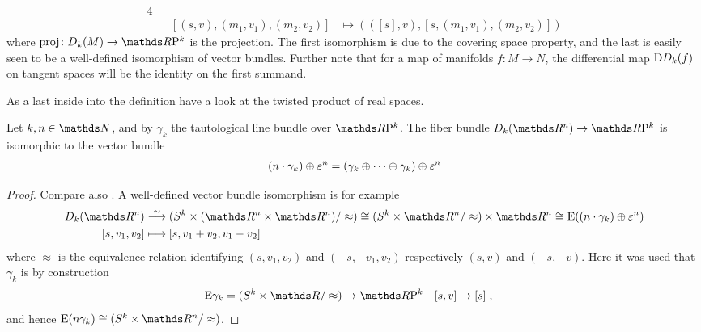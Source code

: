 \begin{Rem}
\begin{enumerate}
\begin{enumerate}
\begin{alignat*}{4}
        \\
        &&[(s,v), (m_1,v_1), (m_2,v_2)]
        &\longmapsto
        \left( ([s], v), [s, (m_1,v_1), (m_2, v_2)] \right)
      \end{alignat*}
      where $\proj\colon\Twistedprod{k}{M}\to\RP k$ is the projection.
      The first isomorphism is due to the covering space property, and
      the last is easily seen to be a well-defined isomorphism of
      vector bundles.
      Further note that for a map of manifolds $f\colon M\to N$,
      the differential map $\mathrm{D}D_{k}({f})$ on tangent spaces
      will be the identity on the first summand.
    \end{enumerate}
  \end{enumerate}
\end{Rem}

As a last inside into the definition have a look at the twisted
product of real spaces.
\begin{Lem}\label{lem:twistedprodrealspace}
  Let $k, n\in\Nat$,
  and by $\gamma_k$ the tautological line bundle over
  $\RP k$.
  The fiber bundle $\Twistedprod{k}{\R^n}\to \RP k$ is isomorphic to
  the vector bundle
  \begin{gather*}
    (n\cdot\gamma_k)\oplus\varepsilon^n
    = (\gamma_k\oplus\dotsb\oplus\gamma_k)\oplus\varepsilon^n
  \end{gather*}
  \begin{proof}
    Compare also \cite[Prop.~4.3,p~1107]{brown}.
    A well-defined vector bundle isomorphism is for example
    \begin{align*}
      \Twistedprod{k}{\R^n}
      &\overset{\sim}\longto
        (\Twistedprodcovspace{k}{\R^n}/\approx)
        \cong (\Sphere{k}\times\R^n/\approx)\times\R^n
        \cong \E{((n\cdot\gamma_k)\oplus\trivbdl^n)}
      \\
      [s, v_1, v_2]
      &\longmapsto
        [s, v_1+v_2, v_1-v_2]
    \end{align*}
    where $\approx$ is the equivalence relation identifying
    $(s,v_1,v_2)$ and $(-s,-v_1,v_2)$ respectively $(s,v)$ and
    $(-s,-v)$.
    Here it was used that $\gamma_k$ is by
    construction
    \begin{align*}
      \E{\gamma_k} = (\Sphere k\times\R/\approx) &\to \RP k
      &[s,v] &\mapsto [s]
               \;,
    \end{align*}
    and hence
    $\E{(n\gamma_k)}\cong(\Sphere k \times\R^n/\approx)$.
  \end{proof}
\end{Lem}

